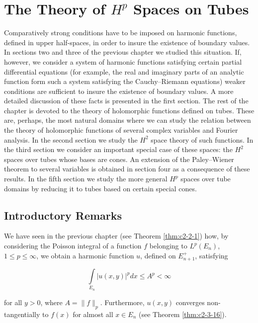 \chapter{The Theory of \texorpdfstring{$H^{p}$}{Hp} Spaces on Tubes}
\label{ch:c3}

Comparatively strong conditions have to be imposed on harmonic functions, defined in upper half-spaces, in order to insure the existence of boundary values. In sections two and three of the previous chapter we studied this situation. If, however, we consider a system of harmonic functions satisfying certain partial differential equations (for example, the real and imaginary parts of an analytic function form such a system satisfying the Cauchy--Riemann equations) weaker conditions are sufficient to insure the existence of boundary values. A more detailed discussion of these facts is presented in the first section. The rest of the chapter is devoted to the theory of holomorphic functions defined on tubes. These are, perhaps, the most natural domains where we can study the relation between the theory of holomorphic functions of several complex variables and Fourier analysis. In the second section we study the $H^2$ space theory of such functions. In the third section we consider an important special case of these spaces: the $H^2$ spaces over tubes whose bases are cones. An extension of the Paley--Wiener theorem to several variables is obtained in section four as a consequence of these results. In the fifth section we study the more general $H^p$ spaces over tube domains by reducing it to tubes based on certain special cones.

\section{Introductory Remarks}

We have seen in the previous chapter (see Theorem \ref{thm:c2-2-1}) how, by considering the Poisson integral of a function $f$ belonging to $L^p(E_n)$, $1 \leq p \leq \infty$, we obtain a harmonic function $u$, defined on $E_{n+1}^+$, satisfying

\begin{equation}\label{eq:c3-1-1}
\int\limits_{E_{n}}\left|u(x,y)\right|^{p} dx\leq A^{p}<\infty
\end{equation}

for all $y > 0$, where $A = \|f\|_p$. Furthermore, $u(x, y)$ converges non-tangentially to $f(x)$ for almost all $x \in E_n$ (see Theorem \ref{thm:c2-3-16}).

